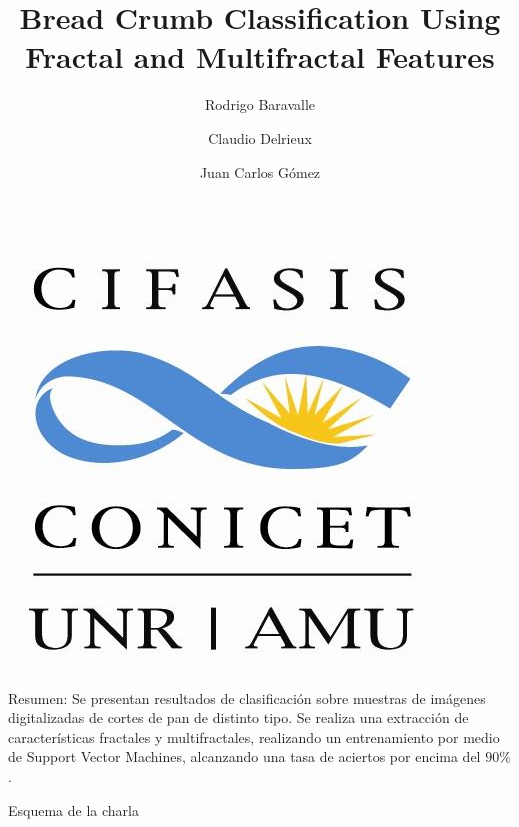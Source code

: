 \documentclass{beamer}
\title[Bread Crumb Classification Using Fractal and Multifractal Features] %
{Bread Crumb Classification Using Fractal and Multifractal Features}
\author
{Rodrigo Baravalle\inst{1} \and Claudio Delrieux\inst{2} \and Juan Carlos G\'omez\inst{1}}
\institute
{
  \inst{1}%
  Laboratorio de Sistemas Din\'amicos y Procesamiento de Informaci\'on. FCEIA, Universidad Nacional de Rosario - CIFASIS - CONICET. \{baravalle,gomez\}@cifasis-conicet.gov.ar
  \and
  \inst{2}%
DIEC, Universidad Nacional del Sur - IIIE-CONICET. cad@uns.edu.ar
}
\date[Noviembre 2012] %
\begin{document}
\begin{frame}
  \titlepage
    \begin{center}
    \includegraphics[scale=0.08]{cifasislogo}
    \end{center}
\end{frame}

\begin{frame}
{\huge Resumen:}
Se presentan resultados de clasificaci\'on sobre muestras de im\'agenes digitalizadas de cortes de pan de distinto tipo. Se realiza una extracci\'on de caracter\'isticas fractales y multifractales, realizando un entrenamiento por medio de Support Vector Machines, alcanzando una tasa de aciertos por encima del $90\%$.
\end{frame}

\begin{frame}{Esquema de la charla}
  \tableofcontents[pausesections]
\end{frame}



\end{document}
